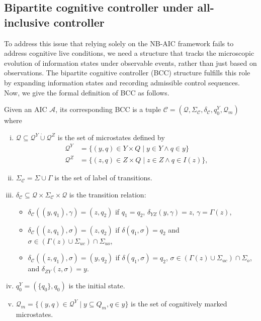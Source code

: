 \documentclass[journal,twoside,web]{ieeecolor}
\begin{document}
\subsection{Bipartite cognitive controller under all-inclusive controller}

To address this issue that relying solely on the NB-AIC framework fails to address cognitive live conditions, we need a structure that tracks the microscopic evolution of information states under observable events, rather than just based on observations. 
The bipartite cognitive controller (BCC) structure fulfills this role by expanding information states and recording admissible control sequences.
Now, we give the formal definition of BCC as follows.
%
\begin{definition}\label{def:bcc}
Given an AIC $\mathcal{A}$, its corresponding
BCC is a tuple
$
\mathcal{C} = (\bm{\mathcal{Q}}, \Sigma_\mathcal{C}, \delta_\mathcal{C}, q^Y_0, \bm{\mathcal{Q}}_m)
$
where
\begin{enumerate}[(i)]
    \item $\bm{\mathcal{Q}} \subseteq \bm{\mathcal{Q}}^Y \dot{\cup} \bm{\mathcal{Q}}^Z$ is the set of microstates defined by
    $$
    \begin{aligned}
        \bm{\mathcal{Q}}^Y &= \{ (y, q) \in Y \times Q \mid y \in Y \wedge q \in y \} \\
        \bm{\mathcal{Q}}^Z &= \{ (z, q) \in Z \times Q \mid z \in Z \wedge q \in I(z) \},        
    \end{aligned}
    $$

    \item $\Sigma_\mathcal{C} = \Sigma \cup \Gamma$ is the set of label of transitions.

    \item $\delta_\mathcal{C} \subseteq \bm{\mathcal{Q}} \times \Sigma_\mathcal{C} \times \bm{\mathcal{Q}}$ is the transition relation:
    \begin{itemize}
        \item $\delta_\mathcal{C}((y,q_1),\gamma) = (z,q_2)$ if $q_1=q_2$, $\delta_{YZ}(y,\gamma)=z$, $\gamma=\Gamma(z)$,
        \item $\delta_\mathcal{C}((z,q_1),\sigma) = (z,q_2)$ if $\delta(q_1,\sigma)=q_2$ and $\sigma \in (\Gamma(z)\cup\Sigma_{uc}) \cap \Sigma_{uo}$,
        \item $\delta_\mathcal{C}((z,q_1),\sigma) = (y,q_2)$ if $\delta(q_1,\sigma)=q_2$, $\sigma \in (\Gamma(z)\cup\Sigma_{uc}) \cap \Sigma_o$, and $\delta_{ZY}(z,\sigma)=y$.
    \end{itemize}

    \item $q^Y_0 = (\{q_0\}, q_0)$ is the initial state.

    \item $\bm{\mathcal{Q}}_m = \{ (y,q) \in \bm{\mathcal{Q}}^Y \mid y\subseteq Q_m, q\in y \}$ is the set of cognitively marked microstates.
\end{enumerate}
\end{definition}
\end{document}
